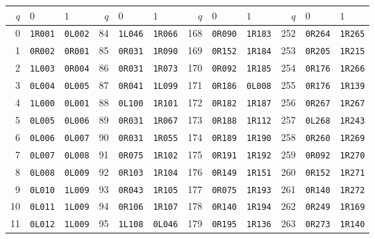 \begingroup
\small
\setlength{\tabcolsep}{3pt}
\begin{longtable}{rll@{\qquad}rll@{\qquad}rll@{\qquad}rll}
\toprule
$q$ & $0$ & $1$ & $q$ & $0$ & $1$ & $q$ & $0$ & $1$ & $q$ & $0$ & $1$ \\
\midrule
\endhead
0 & \texttt{1R001} & \texttt{0L002} & 84 & \texttt{1L046} & \texttt{1R066} & 168 & \texttt{0R090} & \texttt{1R183} & 252 & \texttt{0R264} & \texttt{1R265} \\
1 & \texttt{0R002} & \texttt{0R001} & 85 & \texttt{0R031} & \texttt{1R090} & 169 & \texttt{0R152} & \texttt{1R184} & 253 & \texttt{0R205} & \texttt{1R215} \\
2 & \texttt{1L003} & \texttt{0R004} & 86 & \texttt{0R031} & \texttt{1R073} & 170 & \texttt{0R092} & \texttt{1R185} & 254 & \texttt{0R176} & \texttt{1R266} \\
3 & \texttt{0L004} & \texttt{0L005} & 87 & \texttt{0R041} & \texttt{1L099} & 171 & \texttt{0R186} & \texttt{0L008} & 255 & \texttt{0R176} & \texttt{1R139} \\
4 & \texttt{1L000} & \texttt{0L001} & 88 & \texttt{0L100} & \texttt{1R101} & 172 & \texttt{0R182} & \texttt{1R187} & 256 & \texttt{0R267} & \texttt{1R267} \\
5 & \texttt{0L005} & \texttt{0L006} & 89 & \texttt{0R031} & \texttt{1R067} & 173 & \texttt{0R188} & \texttt{1R112} & 257 & \texttt{0L268} & \texttt{1R243} \\
6 & \texttt{0L006} & \texttt{0L007} & 90 & \texttt{0R031} & \texttt{1R055} & 174 & \texttt{0R189} & \texttt{1R190} & 258 & \texttt{0R260} & \texttt{1R269} \\
7 & \texttt{0L007} & \texttt{0L008} & 91 & \texttt{0R075} & \texttt{1R102} & 175 & \texttt{0R191} & \texttt{1R192} & 259 & \texttt{0R092} & \texttt{1R270} \\
8 & \texttt{0L008} & \texttt{0L009} & 92 & \texttt{0R103} & \texttt{1R104} & 176 & \texttt{0R149} & \texttt{1R151} & 260 & \texttt{0R152} & \texttt{1R271} \\
9 & \texttt{0L010} & \texttt{1L009} & 93 & \texttt{0R043} & \texttt{1R105} & 177 & \texttt{0R075} & \texttt{1R193} & 261 & \texttt{0R140} & \texttt{1R272} \\
10 & \texttt{0L011} & \texttt{1L009} & 94 & \texttt{0R106} & \texttt{1R107} & 178 & \texttt{0R140} & \texttt{1R194} & 262 & \texttt{0R249} & \texttt{1R169} \\
11 & \texttt{0L012} & \texttt{1L009} & 95 & \texttt{1L108} & \texttt{0L046} & 179 & \texttt{0R195} & \texttt{1R136} & 263 & \texttt{0R273} & \texttt{1R140} \\

\end{longtable}

